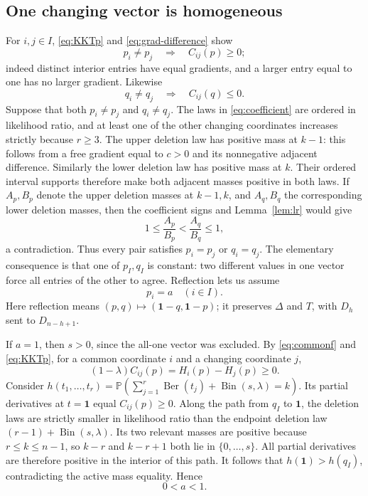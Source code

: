 \documentclass[11pt]{article}
\numberwithin{equation}{section}
\theoremstyle{remark}\newtheorem{remark}[theorem]{Remark}
\DeclareMathOperator{\Ber}{Ber}
\DeclareMathOperator{\Bin}{Bin}
\newcommand{\PP}{\mathbb P}
\newcommand{\one}{\mathbf 1}
\begin{document}
\subsection{One changing vector is homogeneous}
For $i,j\in I$, \eqref{eq:KKTp} and \eqref{eq:grad-difference} show
\[
 p_i\ne p_j\quad\Longrightarrow\quad C_{ij}(p)\ge0;
\]
indeed distinct interior entries have equal gradients, and a larger
entry equal to one has no larger gradient. Likewise
\[
 q_i\ne q_j\quad\Longrightarrow\quad C_{ij}(q)\le0.
\]
Suppose that both $p_i\ne p_j$ and $q_i\ne q_j$. The laws in
\eqref{eq:coefficient} are ordered in likelihood ratio, and at least
one of the other changing coordinates increases strictly because
$r\ge3$. The upper deletion law has positive mass at $k-1$: this follows
from a free gradient equal to $c>0$ and its nonnegative adjacent
difference. Similarly the lower deletion law has positive mass at $k$.
Their ordered interval supports therefore make both adjacent masses
positive in both laws. If $A_p,B_p$ denote the upper deletion masses
at $k-1,k$, and $A_q,B_q$ the corresponding lower deletion masses,
then the coefficient signs and Lemma~\ref{lem:lr} would give
\[
 1\le\frac{A_p}{B_p}<\frac{A_q}{B_q}\le1,
\]
a contradiction. Thus every pair satisfies $p_i=p_j$ or $q_i=q_j$.
The elementary consequence is that one of $p_I,q_I$ is constant: two
different values in one vector force all entries of the other to agree.
Reflection lets us assume
\begin{equation}\label{eq:pa}
 p_i=a\quad(i\in I).
\end{equation}
Here reflection means $(p,q)\mapsto(\one-q,\one-p)$; it preserves
$\Delta$ and $T$, with $D_h$ sent to $D_{n-h+1}$.

If $a=1$, then $s>0$, since the all-one vector was excluded. By
\eqref{eq:commonf} and \eqref{eq:KKTp}, for a common coordinate $i$
and a changing coordinate $j$,
\[
 (1-\lambda)C_{ij}(p)=H_i(p)-H_j(p)\ge0.
\]
Consider
$h(t_1,\ldots,t_r)=\PP(\sum_{j=1}^r\Ber(t_j)+\Bin(s,\lambda)=k)$.
Its partial derivatives at $t=\one$ equal $C_{ij}(p)\ge0$.
Along the path from $q_I$ to $\one$, the deletion laws are strictly
smaller in likelihood ratio than the endpoint deletion law
$(r-1)+\Bin(s,\lambda)$. Its two relevant masses are positive because
$r\le k\le n-1$, so $k-r$ and $k-r+1$ both lie in $\{0,\ldots,s\}$. All partial derivatives are therefore positive in the
interior of this path. It follows that
$h(\one)>h(q_I)$, contradicting the active mass equality. Hence
\begin{equation}\label{eq:a-interior}
 0<a<1.
\end{equation}
\end{document}
